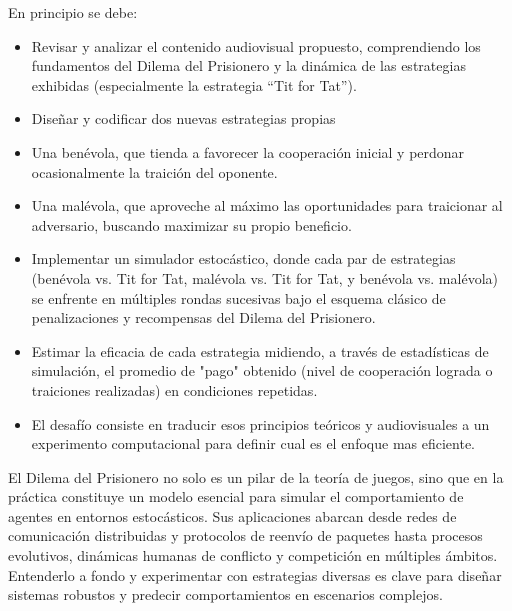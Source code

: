 \documentclass{article}
\begin{document}
En principio se debe:
\begin{itemize}
  \item Revisar y analizar el contenido audiovisual propuesto, comprendiendo los fundamentos 
    del Dilema del Prisionero y la dinámica de las estrategias exhibidas 
    (especialmente la estrategia “Tit for Tat”).

  \item Diseñar y codificar dos nuevas estrategias propias

  \item Una benévola, que tienda a favorecer la cooperación inicial y perdonar 
    ocasionalmente la traición del oponente.

  \item Una malévola, que aproveche al máximo las oportunidades para traicionar al adversario, 
    buscando maximizar su propio beneficio.

  \item Implementar un simulador estocástico, donde cada par de estrategias 
    (benévola vs. Tit for Tat, malévola vs. Tit for Tat, y benévola vs. malévola) 
      se enfrente en múltiples rondas sucesivas bajo el esquema clásico de penalizaciones y 
      recompensas del Dilema del Prisionero.

  \item Estimar la eficacia de cada estrategia midiendo, a través de estadísticas de simulación, 
    el promedio de "pago" obtenido (nivel de cooperación lograda o traiciones realizadas) 
      en condiciones repetidas.

  \item El desafío consiste en traducir esos principios teóricos y audiovisuales a un 
  experimento computacional para definir cual es el enfoque mas eficiente.
\end{itemize}


El Dilema del Prisionero no solo es un pilar de la teoría de juegos, sino que en la práctica 
constituye un modelo esencial para simular el comportamiento de agentes en entornos estocásticos. 
Sus aplicaciones abarcan desde redes de comunicación distribuidas y protocolos de reenvío de 
paquetes hasta procesos evolutivos, dinámicas humanas de conflicto y competición en múltiples 
ámbitos. Entenderlo a fondo y experimentar con estrategias diversas es clave para diseñar 
sistemas robustos y predecir comportamientos en escenarios complejos.
\end{document}
